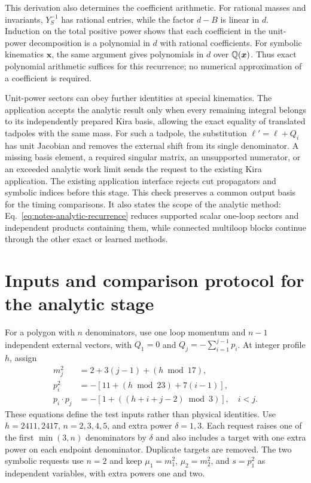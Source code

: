 This derivation also determines the coefficient arithmetic. For rational masses and invariants, $Y_S^{-1}$ has rational entries, while the factor $d-B$ is linear in $d$. Induction on the total positive power shows that each coefficient in the unit-power decomposition is a polynomial in $d$ with rational coefficients. For symbolic kinematics $\boldsymbol x$, the same argument gives polynomials in $d$ over $\mathbb Q(\boldsymbol x)$. Thus exact polynomial arithmetic suffices for this recurrence; no numerical approximation of a coefficient is required.

Unit-power sectors can obey further identities at special kinematics. The application accepts the analytic result only when every remaining integral belongs to its independently prepared Kira basis, allowing the exact equality of translated tadpoles with the same mass. For such a tadpole, the substitution $\ell'=\ell+Q_i$ has unit Jacobian and removes the external shift from its single denominator. A missing basis element, a required singular matrix, an unsupported numerator, or an exceeded analytic work limit sends the request to the existing Kira application. The existing application interface rejects cut propagators and symbolic indices before this stage. This check preserves a common output basis for the timing comparisons. It also states the scope of the analytic method: Eq.~\eqref{eq:notes-analytic-recurrence} reduces supported scalar one-loop sectors and independent products containing them, while connected multiloop blocks continue through the other exact or learned methods.

\section{Inputs and comparison protocol for the analytic stage}
\label{app:notes-analytic-inputs}
For a polygon with $n$ denominators, use one loop momentum and $n-1$ independent external vectors, with $Q_1=0$ and $Q_j=-\sum_{i=1}^{j-1}p_i$. At integer profile $h$, assign
\begin{align}
 m_j^2&=2+3(j-1)+(h\bmod17),\\
 p_i^2&=-[11+(h\bmod23)+7(i-1)],\\
 p_i\cdot p_j&=-[1+((h+i+j-2)\bmod3)],\quad i<j.
\end{align}
These equations define the test inputs rather than physical identities. Use $h=2411,2417$, $n=2,3,4,5$, and extra power $\delta=1,3$. Each request raises one of the first $\min(3,n)$ denominators by $\delta$ and also includes a target with one extra power on each endpoint denominator. Duplicate targets are removed. The two symbolic requests use $n=2$ and keep $\mu_1=m_1^2$, $\mu_2=m_2^2$, and $s=p_1^2$ as independent variables, with extra powers one and two.

